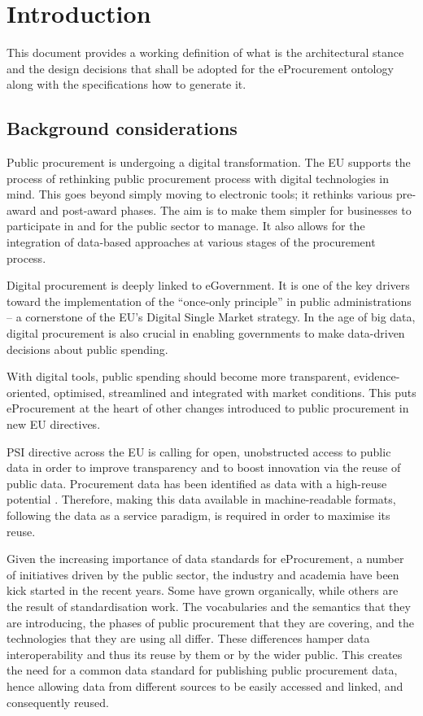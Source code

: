 \section{Introduction}
\label{sec:introduction}

 	This document provides a working definition of what is the architectural stance and the design decisions that shall be adopted for the eProcurement ontology along with the specifications how to generate it. 
	
	\subsection{Background considerations}
	
	Public procurement is undergoing a digital transformation. The EU supports the process of rethinking public procurement process with digital technologies in mind. This goes beyond simply moving to electronic tools; it rethinks various pre-award and post-award phases. The aim is to make them simpler for businesses to participate in and for the public sector to manage. It also allows for the integration of data-based approaches at various stages of the procurement process.
	
	Digital procurement is deeply linked to eGovernment. It is one of the key drivers toward the implementation of the ``once-only principle'' in public administrations -- a cornerstone of the EU's Digital Single Market strategy. In the age of big data, digital procurement is also crucial in enabling governments to make data-driven decisions about public spending.
	
	With digital tools, public spending should become more transparent, evidence-oriented, optimised, streamlined and integrated with market conditions. This puts eProcurement at the heart of other changes introduced to public procurement in new EU directives.
	
	PSI directive \cite{directive-2013/37/EU} across the EU is calling for open, unobstructed access to public data in order to improve transparency and to boost innovation via the reuse of public data. Procurement data has been identified as data with a high-reuse potential \cite{d-high-value-assets}. Therefore, making this data available in machine-readable formats, following the data as a service paradigm, is required in order to maximise its reuse.
	
	Given the increasing importance of data standards for eProcurement, a number of initiatives driven by the public sector, the industry and academia have been kick started	in the recent years. Some have grown organically, while others are the result of	standardisation work. The vocabularies and the semantics that they are introducing, the 
	phases of public procurement that they are covering, and the technologies that they are using all differ. These differences hamper data interoperability and thus its reuse by them or by the wider public. This creates the need for a common data standard for publishing public procurement data, hence allowing data from different sources to be 
	easily accessed and linked, and consequently reused. 
	
